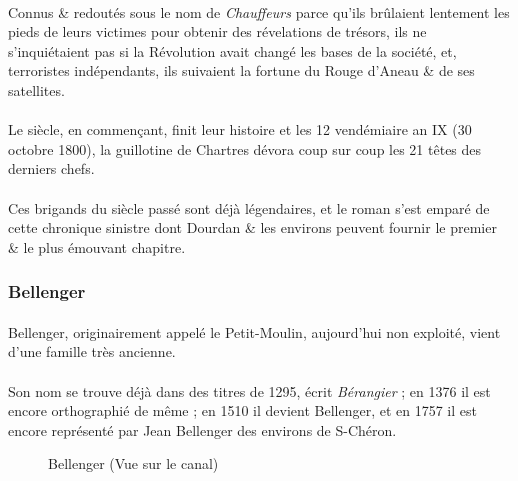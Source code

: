 \documentclass[../eBook.tex]{subfiles}
\begin{document}
      \paragraph{}Connus \& redoutés sous le nom de \og \textit{Chauffeurs} \fg{}  parce qu'ils brûlaient lentement les pieds de leurs victimes pour obtenir des révelations de trésors, ils ne s'inquiétaient pas si la Révolution avait changé les bases de la société, et, terroristes indépendants, ils suivaient la fortune du Rouge d'Aneau \& de ses satellites.
      \paragraph{}Le siècle, en commençant, finit leur histoire et les 12 vendémiaire an IX (30 octobre 1800), la guillotine de Chartres dévora coup sur coup les 21 têtes des derniers chefs.
      \paragraph{}Ces brigands du siècle passé sont déjà légendaires, et le roman s'est emparé de cette chronique sinistre dont Dourdan \& les environs peuvent fournir le premier \& le plus émouvant chapitre.

    \subsubsection*{Bellenger}
      \paragraph{}Bellenger, originairement appelé le Petit-Moulin, aujourd'hui non exploité, vient d'une famille très ancienne.
      \paragraph{}Son nom se trouve déjà dans des titres de 1295, écrit \og \textit{Bérangier} \fg{} ; en 1376 il est encore orthographié de même ; en 1510 il devient Bellenger, et en 1757 il est encore représenté par Jean Bellenger des environs de S-Chéron.
      \begin{center}
        \begin{figure}[!ht]
          \caption*{Bellenger (Vue sur le canal)}
        \end{figure}
      \end{center}
\end{document}

